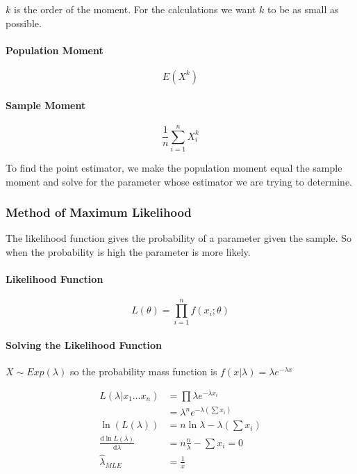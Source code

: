 \documentclass[12pt]{article}
\begin{document}
	\(k\) is the order of the moment. For the calculations we want \(k\) to be as small as possible.
	
	\paragraph{Population Moment}
	
	\begin{equation*}
		E(X^k)
	\end{equation*}
	
	\paragraph{Sample Moment}
	
	\begin{equation*}
		\frac{1}{n}\sum_{i=1}^{n}X_{i}^{k}
	\end{equation*}
	
	\noindent To find the point estimator, we make the population moment equal the sample moment and solve for the parameter whose estimator we are trying to determine.
	
	\newpage
	\subsubsection{Method of Maximum Likelihood}
	
	The likelihood function gives the probability of a parameter given the sample. So when the probability is high the parameter is more likely.
	
	\paragraph{Likelihood Function}
	
	\begin{equation*}
		L(\theta) = \prod_{i=1}^{n}f(x_i;\theta)
	\end{equation*}
	
	\paragraph{Solving the Likelihood Function}
	
	\(X\sim Exp(\lambda)\) so the probability mass function is \(f(x|\lambda)=\lambda e^{-\lambda x}\)
	
	\begin{align*}
		L(\lambda |x_1\ldots x_n) &= \prod\lambda e^{-\lambda x_i} \\
		&= \lambda ^n e^{-\lambda\left(\sum x_i\right)} \\
		\ln\left(L(\lambda)\right) &= n\ln \lambda - \lambda\left(\sum x_i\right) \\
		\frac{\mathrm{d}\ln L(\lambda)}{\mathrm{d}\lambda} &= n\frac{n}{\lambda} - \sum x_i = 0 \\
		\hat{\lambda}_{MLE} &= \frac{1}{\bar{x}}
	\end{align*}
	
\end{document}
